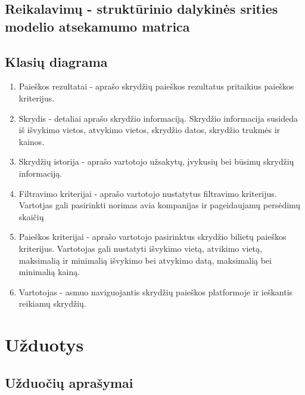 \documentclass{VUMIFPSkursinis}
\begin{document}
            \subsection{Reikalavimų - struktūrinio dalykinės srities modelio atsekamumo matrica}
            \subsection{Klasių diagrama}
                \begin{enumerate}[label=\textbf{E\arabic*}.]
                    \item Paieškos rezultatai - aprašo skrydžių paieškos rezultatus pritaikius paieškos kriterijus.
                    \item Skrydis - detaliai aprašo skrydžio informaciją. Skrydžio informacija susideda iš išvykimo vietos, atvykimo vietos, skrydžio datos, skrydžio trukmės ir kainos.
                    \item Skrydžių istorija - aprašo vartotojo užsakytų, įvykusių bei būsimų skrydžių informaciją.
                    \item Filtravimo kriterijai - aprašo vartotojo nustatytus filtravimo kriterijus. Vartotjas gali pasirinkti norimas avia kompanijas ir pageidaujamų persėdimų skaičių
                    \item Paieškos kriterijai - aprašo vartotojo pasirinktus skrydžio bilietų paieškos kriterijus. Vartotojas gali nustatyti išvykimo vietą, atvikimo vietą, maksimalią ir minimalią išvykimo bei atvykimo datą, maksimalią bei minimalią kainą.
                    \item Vartotojas - asmuo naviguojantis skrydžių paieškos platformoje ir ieškantis reikiamų skrydžių.
                \end{enumerate}
      
        \section{Užduotys}
            \subsection{Užduočių aprašymai}
            
\end{document}

